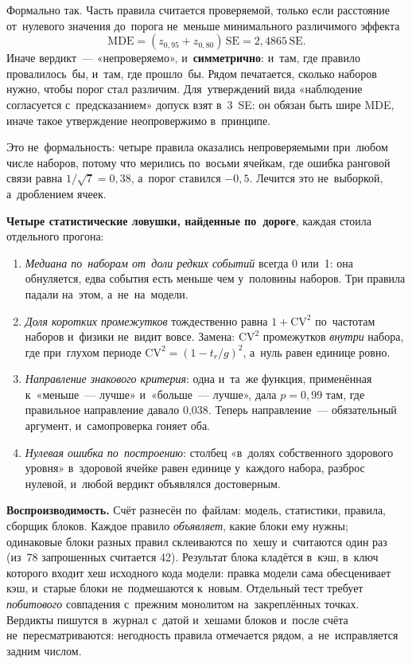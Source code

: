Формально так. Часть правила считается проверяемой, только если расстояние от~нулевого значения до~порога не~меньше минимального различимого эффекта
\[\mathrm{MDE}=(z_{0{,}95}+z_{0{,}80})\,\mathrm{SE}=2{,}4865\,\mathrm{SE}.\]
Иначе вердикт~--- «непроверяемо», и~\textbf{симметрично}: и~там, где правило провалилось~бы, и~там, где прошло~бы. Рядом печатается, сколько наборов нужно, чтобы порог стал различим. Для~утверждений вида «наблюдение согласуется с~предсказанием» допуск взят в~3~SE: он обязан быть шире MDE, иначе такое утверждение неопровержимо в~принципе.

Это не~формальность: четыре правила оказались непроверяемыми при~любом числе наборов, потому что мерились по~восьми ячейкам, где ошибка ранговой связи равна $1/\sqrt{7}=0{,}38$, а~порог ставился $-0{,}5$. Лечится это не~выборкой, а~дроблением ячеек.

\textbf{Четыре статистические ловушки, найденные по~дороге}, каждая стоила отдельного прогона:
\begin{enumerate}
\item \emph{Медиана по~наборам от~доли редких событий} всегда 0 или~1: она обнуляется, едва события есть меньше чем у~половины наборов. Три правила падали на~этом, а~не~на~модели.
\item \emph{Доля коротких промежутков} тождественно равна $1+\mathrm{CV}^2$ по~частотам наборов и~физики не~видит вовсе. Замена: $\mathrm{CV}^2$ промежутков \emph{внутри} набора, где при~глухом периоде $\mathrm{CV}^2=(1-t_r/g)^2$, а~нуль равен единице ровно.
\item \emph{Направление знакового критерия}: одна и~та~же функция, применённая к~«меньше~--- лучше» и~«больше~--- лучше», дала $p=0{,}99$ там, где правильное направление давало 0,038. Теперь направление~--- обязательный аргумент, и~самопроверка гоняет оба.
\item \emph{Нулевая ошибка по~построению}: столбец «в~долях собственного здорового уровня» в~здоровой ячейке равен единице у~каждого набора, разброс нулевой, и~любой вердикт объявлялся достоверным.
\end{enumerate}

\textbf{Воспроизводимость.} Счёт разнесён по~файлам: модель, статистики, правила, сборщик блоков. Каждое правило \emph{объявляет}, какие блоки ему нужны; одинаковые блоки разных правил склеиваются по~хешу и~считаются один раз (из~78 запрошенных считается 42). Результат блока кладётся в~кэш, в~ключ которого входит хеш исходного кода модели: правка модели сама обесценивает кэш, и~старые блоки не~подмешаются к~новым. Отдельный тест требует \emph{побитового} совпадения с~прежним монолитом на~закреплённых точках. Вердикты пишутся в~журнал с~датой и~хешами блоков и~после счёта не~пересматриваются: негодность правила отмечается рядом, а~не~исправляется задним числом.

